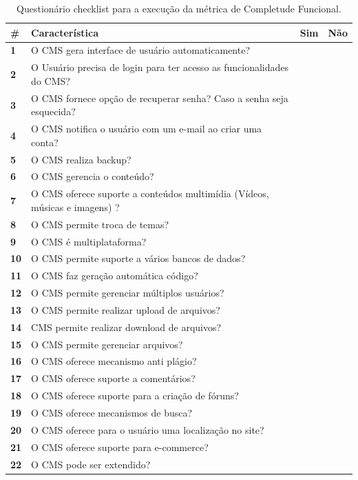 \begin{apendicesenv}
    \begin{longtable}[htbp]{|p{18pt}|p{350pt}|p{20pt}|p{20pt}|}
    \caption{Questionário checklist para a execução da métrica de Completude Funcional.} 
     	\label{}\\
   \hline
    \textbf{\#} & \textbf{Característica} & \textbf{Sim} & \textbf{Não} \\\hline
   
    \textbf{1} & O CMS gera interface de usuário automaticamente? &       &  \\\hline
    \textbf{2} & O Usuário precisa de login para ter acesso as funcionalidades do CMS? &       &  \\\hline
    \textbf{3} & O CMS fornece opção de recuperar senha? Caso a senha seja esquecida? &       &  \\\hline
    \textbf{4} & O CMS notifica o usuário com um e-mail ao criar uma conta?  &       &  \\\hline
    \textbf{5} & O CMS realiza backup? &       &  \\\hline
    \textbf{6} & O CMS gerencia o conteúdo? &       &  \\\hline
    \textbf{7} & O CMS oferece suporte a conteúdos multimídia (Vídeos, músicas e imagens) ? &       &  \\\hline
    \textbf{8} & O CMS permite troca de temas? &       &  \\\hline
    \textbf{9} & O CMS é multiplataforma? &       &  \\\hline
    \textbf{10} & O CMS permite suporte a vários bancos de dados? &       &  \\\hline
    \textbf{11} & O CMS faz geração automática código? &       &  \\\hline
    \textbf{12} & O CMS permite gerenciar múltiplos usuários? &       &  \\\hline
    \textbf{13} & O CMS permite realizar upload de arquivos? &       &  \\\hline
    \textbf{14} &  CMS permite realizar download de arquivos? &       &  \\\hline
    \textbf{15} & O CMS permite gerenciar arquivos? &       &  \\\hline
    \textbf{16} & O CMS oferece mecanismo anti plágio? &       &  \\\hline
    \textbf{17} & O CMS oferece suporte a comentários? &       &  \\\hline
    \textbf{18} & O CMS oferece suporte para a criação de fóruns? &       &  \\\hline
    \textbf{19} & O CMS oferece mecanismos de busca? &       &  \\\hline
    \textbf{20} & O CMS oferece para o usuário uma localização no site? &       &  \\\hline
    \textbf{21} & O CMS oferece suporte para e-commerce? &       &  \\\hline
    \textbf{22} & O CMS pode ser extendido? &       &  \\\hline
    \end{longtable}%

\end{apendicesenv}
